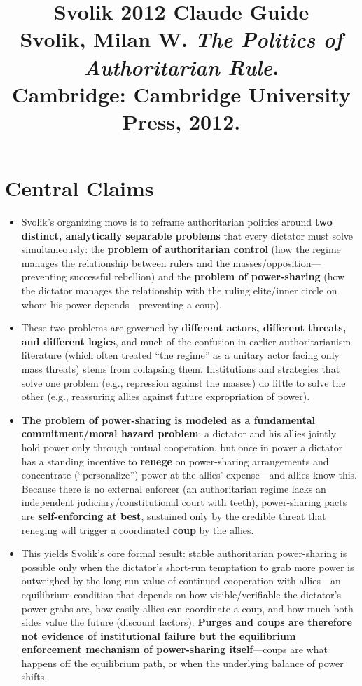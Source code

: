 \documentclass[12pt]{article}
\title{\textbf{Svolik 2012 Claude Guide}\\
\large Svolik, Milan W. \textit{The Politics of Authoritarian Rule}.\\
Cambridge: Cambridge University Press, 2012.}
\author{}
\date{}
\begin{document}
\maketitle
\tableofcontents
\newpage

\section{Central Claims}

\begin{itemize}[leftmargin=*, itemsep=4pt]
    \item Svolik's organizing move is to reframe authoritarian politics around \textbf{two distinct, analytically separable problems} that every dictator must solve simultaneously: the \textbf{problem of authoritarian control} (how the regime manages the relationship between rulers and the masses/opposition---preventing successful rebellion) and the \textbf{problem of power-sharing} (how the dictator manages the relationship with the ruling elite/inner circle on whom his power depends---preventing a coup).
    \item These two problems are governed by \textbf{different actors, different threats, and different logics}, and much of the confusion in earlier authoritarianism literature (which often treated ``the regime'' as a unitary actor facing only mass threats) stems from collapsing them. Institutions and strategies that solve one problem (e.g., repression against the masses) do little to solve the other (e.g., reassuring allies against future expropriation of power).
    \item \textbf{The problem of power-sharing is modeled as a fundamental commitment/moral hazard problem}: a dictator and his allies jointly hold power only through mutual cooperation, but once in power a dictator has a standing incentive to \textbf{renege} on power-sharing arrangements and concentrate (``personalize'') power at the allies' expense---and allies know this. Because there is no external enforcer (an authoritarian regime lacks an independent judiciary/constitutional court with teeth), power-sharing pacts are \textbf{self-enforcing at best}, sustained only by the credible threat that reneging will trigger a coordinated \textbf{coup} by the allies.
    \item This yields Svolik's core formal result: stable authoritarian power-sharing is possible only when the dictator's short-run temptation to grab more power is outweighed by the long-run value of continued cooperation with allies---an equilibrium condition that depends on how visible/verifiable the dictator's power grabs are, how easily allies can coordinate a coup, and how much both sides value the future (discount factors). \textbf{Purges and coups are therefore not evidence of institutional failure but the equilibrium enforcement mechanism of power-sharing itself}---coups are what happens off the equilibrium path, or when the underlying balance of power shifts.

\end{itemize}
\end{document}
